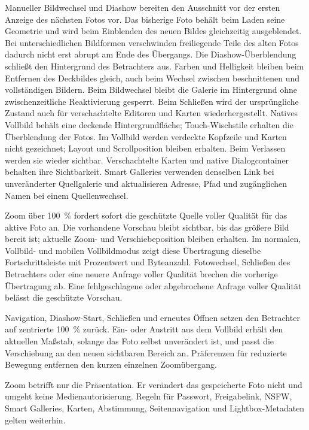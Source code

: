\documentclass[11pt,a4paper]{article}
\begin{document}
Manueller Bildwechsel und Diashow bereiten den Ausschnitt vor der ersten
Anzeige des nächsten Fotos vor. Das bisherige Foto behält beim Laden seine
Geometrie und wird beim Einblenden des neuen Bildes gleichzeitig ausgeblendet.
Bei unterschiedlichen Bildformen verschwinden freiliegende Teile des alten
Fotos dadurch nicht erst abrupt am Ende des Übergangs.
Die Diashow-Überblendung schließt den Hintergrund des Betrachters aus. Farben
und
Helligkeit bleiben beim Entfernen des Deckbildes gleich, auch beim Wechsel
zwischen beschnittenen und vollständigen Bildern.
Beim Bildwechsel bleibt die Galerie im Hintergrund ohne zwischenzeitliche
Reaktivierung gesperrt. Beim Schließen wird der ursprüngliche Zustand auch
für verschachtelte Editoren und Karten wiederhergestellt. Natives Vollbild
behält eine deckende Hintergrundfläche; Touch-Wischstile erhalten die
Überblendung der Fotos.
Im Vollbild werden verdeckte Kopfzeile und Karten nicht gezeichnet; Layout
und Scrollposition bleiben erhalten. Beim Verlassen werden sie wieder sichtbar.
Verschachtelte Karten und native Dialogcontainer behalten ihre Sichtbarkeit.
Smart Galleries verwenden denselben Link bei unveränderter Quellgalerie und
aktualisieren Adresse, Pfad und zugänglichen Namen bei einem Quellenwechsel.

Zoom über 100~\% fordert sofort die geschützte Quelle voller Qualität für das
aktive Foto an. Die vorhandene Vorschau bleibt sichtbar, bis das größere Bild
bereit ist; aktuelle Zoom- und Verschiebeposition bleiben erhalten. Im normalen,
Vollbild- und mobilen Vollbildmodus zeigt diese Übertragung dieselbe
Fortschrittsleiste mit Prozentwert und Byteanzahl. Fotowechsel, Schließen des
Betrachters oder eine neuere Anfrage voller Qualität brechen die vorherige
Übertragung ab. Eine fehlgeschlagene oder abgebrochene Anfrage voller Qualität
belässt die geschützte Vorschau.

Navigation, Diashow-Start, Schließen und erneutes Öffnen setzen den Betrachter
auf zentrierte 100~\% zurück. Ein- oder Austritt aus dem Vollbild erhält den
aktuellen Maßstab, solange das Foto selbst unverändert ist, und passt die
Verschiebung an den neuen sichtbaren Bereich an. Präferenzen für reduzierte
Bewegung entfernen den kurzen einzelnen Zoomübergang.

Zoom betrifft nur die Präsentation. Er verändert das gespeicherte Foto nicht und
umgeht keine Medienautorisierung. Regeln für Passwort, Freigabelink, NSFW, Smart
Galleries, Karten, Abstimmung, Seitennavigation und Lightbox-Metadaten gelten
weiterhin.
\end{document}
